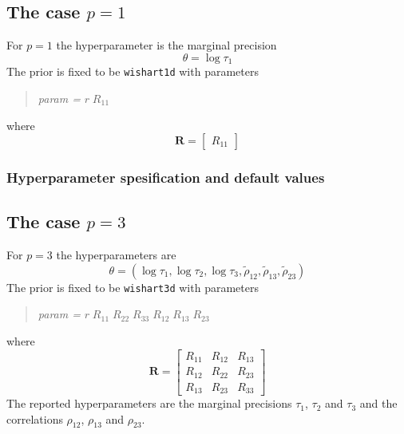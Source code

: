 \documentclass[a4paper,11pt]{article}
\begin{document}
\subsection*{The case $p=1$}

For $p=1$ the
hyperparameter is the marginal precision
\begin{displaymath}
    \theta = \log \tau_{1}
\end{displaymath}
The prior is fixed to be \texttt{wishart1d} with parameters
\begin{quote}
    \emph{param = } $r\;R_{11}$
\end{quote}
where
\begin{displaymath}
    \mathbf{R} =
    \left[\begin{array}{c}
        R_{11}
    \end{array}\right]
\end{displaymath}

\subsubsection*{Hyperparameter spesification and default values}



\subsection*{The case $p=3$}

For $p=3$ the
hyperparameters are
\begin{displaymath}
    \theta = (\log \tau_{1}, \log \tau_{2}, \log \tau_{3},
    \tilde\rho_{12},
    \tilde\rho_{13},
    \tilde\rho_{23})
\end{displaymath}
The prior is fixed to be \texttt{wishart3d} with parameters
\begin{quote}
    \emph{param = } $r\;R_{11}\;R_{22}\;R_{33}\; R_{12}\;
    R_{13}\; R_{23}$
\end{quote}
where
\begin{displaymath}
    \mathbf{R} =
    \left[\begin{array}{ccc}
        R_{11} &R_{12} & R_{13}\\
        R_{12} & R_{22} & R_{23}\\
        R_{13} & R_{23} & R_{33}
    \end{array}\right]
\end{displaymath}
The reported hyperparameters are the marginal precisions $\tau_{1}$,
$\tau_{2}$ and $\tau_{3}$ and the correlations $\rho_{12}$,
$\rho_{13}$ and $\rho_{23}$.
\end{document}

